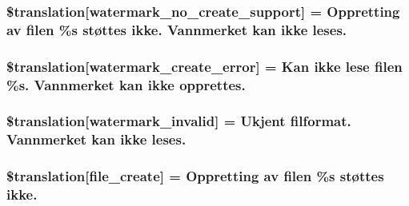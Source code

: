 \subsubsection[{\$translation}]{\setlength{\rightskip}{0pt plus 5cm}\$translation\mbox{[}\textquotesingle{}watermark\+\_\+no\+\_\+create\+\_\+support\textquotesingle{}\mbox{]} = \textquotesingle{}Oppretting av filen \%s støttes ikke. Vannmerket kan ikke leses.\textquotesingle{}}\label{class_8upload_8no___n_o_8php_a82d5853430ab72dc1f9799ec36144cc6}
\hypertarget{class_8upload_8no___n_o_8php_aabca0b65dadbc6184415c16375f284ca}{}
\subsubsection[{\$translation}]{\setlength{\rightskip}{0pt plus 5cm}\$translation\mbox{[}\textquotesingle{}watermark\+\_\+create\+\_\+error\textquotesingle{}\mbox{]} = \textquotesingle{}Kan ikke lese filen \%s. Vannmerket kan ikke opprettes.\textquotesingle{}}\label{class_8upload_8no___n_o_8php_aabca0b65dadbc6184415c16375f284ca}
\hypertarget{class_8upload_8no___n_o_8php_ac336e7a5701e47ba4a05e9e498a3cc44}{}
\subsubsection[{\$translation}]{\setlength{\rightskip}{0pt plus 5cm}\$translation\mbox{[}\textquotesingle{}watermark\+\_\+invalid\textquotesingle{}\mbox{]} = \textquotesingle{}Ukjent filformat. Vannmerket kan ikke leses.\textquotesingle{}}\label{class_8upload_8no___n_o_8php_ac336e7a5701e47ba4a05e9e498a3cc44}
\hypertarget{class_8upload_8no___n_o_8php_a1ecb4673e4fb69e06b3f20b65cecf30a}{}
\subsubsection[{\$translation}]{\setlength{\rightskip}{0pt plus 5cm}\$translation\mbox{[}\textquotesingle{}file\+\_\+create\textquotesingle{}\mbox{]} = \textquotesingle{}Oppretting av filen \%s støttes ikke.\textquotesingle{}}\label{class_8upload_8no___n_o_8php_a1ecb4673e4fb69e06b3f20b65cecf30a}
\hypertarget{class_8upload_8no___n_o_8php_a4712d7ec28e9a7f17eb3338af2358363}{}
